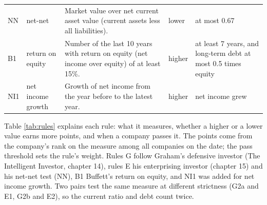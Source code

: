\documentclass[11pt,a4paper]{article}
\begin{document}
\begin{table}[H]
\begin{tabular}{l p{2.2cm} p{5.2cm} l p{2.8cm}}
NN & net-net & Market value over net current asset value (current assets less all liabilities). & lower & at most 0.67 \\
B1 & return on equity & Number of the last 10 years with return on equity (net income over equity) of at least 15\%. & higher & at least 7 years, and long-term debt at most 0.5 times equity \\
NI1 & net income growth & Growth of net income from the year before to the latest year. & higher & net income grew \\
\hline
\end{tabular}
\end{table}
Table \ref{tab:rules} explains each rule: what it measures, whether a higher or a lower value earns more points, and when a company passes it. The points come from the company's rank on the measure among all companies on the date; the pass threshold sets the rule's weight. Rules G follow Graham's defensive investor (The Intelligent Investor, chapter 14), rules E his enterprising investor (chapter 15) and his net-net test (NN), B1 Buffett's return on equity, and NI1 was added for net income growth. Two pairs test the same measure at different strictness (G2a and E1, G2b and E2), so the current ratio and debt count twice.
\end{document}
